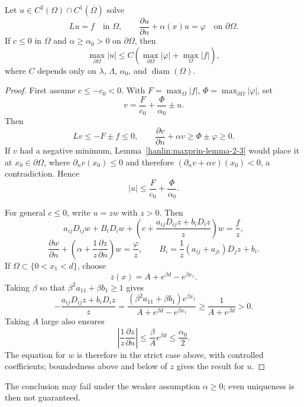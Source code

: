 \begin{theorem}\label{hanlin:maxprin-theorem-2-25}
Let $u\in C^2(\Omega)\cap C^1(\overline\Omega)$ solve
\[
Lu=f\quad\text{in }\Omega,
\qquad
\frac{\partial u}{\partial n}+\alpha(x)u=\varphi
\quad\text{on }\partial\Omega.
\]
If $c\le0$ in $\Omega$ and $\alpha\ge\alpha_0>0$ on $\partial\Omega$, then
\[
\max_{\partial\Omega}|u|
\le C\left(\max_{\partial\Omega}|\varphi|+\max_\Omega|f|\right),
\]
where $C$ depends only on $\lambda$, $\Lambda$, $\alpha_0$, and
$\operatorname{diam}(\Omega)$.
\end{theorem}
\begin{proof}
\sketch First assume $c\le-c_0<0$. With
$F=\max_\Omega|f|$, $\Phi=\max_{\partial\Omega}|\varphi|$, set
\[
v=\frac{F}{c_0}+\frac{\Phi}{\alpha_0}\pm u.
\]
Then
\[
Lv\le-F\pm f\le0,
\qquad
\frac{\partial v}{\partial n}+\alpha v\ge\Phi\pm\varphi\ge0.
\]
If $v$ had a negative minimum, Lemma~\ref{hanlin:maxprin-lemma-2-3} would place
it at $x_0\in\partial\Omega$, where $\partial_nv(x_0)\le0$ and therefore
$(\partial_nv+\alpha v)(x_0)<0$, a contradiction. Hence
\[
|u|\le\frac{F}{c_0}+\frac{\Phi}{\alpha_0}.
\]

For general $c\le0$, write $u=zw$ with $z>0$. Then
\[
a_{ij}D_{ij}w+B_iD_iw+
\left(c+\frac{a_{ij}D_{ij}z+b_iD_iz}{z}\right)w=\frac fz,
\]
\[
\frac{\partial w}{\partial n}
+\left(\alpha+\frac1z\frac{\partial z}{\partial n}\right)w
=\frac\varphi z,
\qquad
B_i=\frac1z(a_{ij}+a_{ji})D_jz+b_i.
\]
If $\Omega\subset\{0<x_1<d\}$, choose
\[
z(x)=A+e^{\beta d}-e^{\beta x_1}.
\]
Taking $\beta$ so that $\beta^2a_{11}+\beta b_1\ge1$ gives
\[
-\frac{a_{ij}D_{ij}z+b_iD_iz}{z}
=\frac{(\beta^2a_{11}+\beta b_1)e^{\beta x_1}}
{A+e^{\beta d}-e^{\beta x_1}}
\ge\frac1{A+e^{\beta d}}>0.
\]
Taking $A$ large also ensures
\[
\left|\frac1z\frac{\partial z}{\partial n}\right|
\le\frac\beta A e^{\beta d}\le\frac{\alpha_0}{2}.
\]
The equation for $w$ is therefore in the strict case above, with controlled
coefficients; boundedness above and below of $z$ gives the result for $u$.
\end{proof}

\begin{remark}\label{hanlin:maxprin-remark-2-26}


The conclusion may fail under the weaker assumption $\alpha\ge0$; even
uniqueness is then not guaranteed.
\end{remark}

